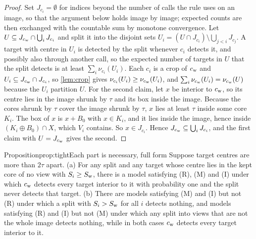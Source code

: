 \begin{proof}
Set $J_{c_i} = \emptyset$ for indices beyond the number of calls the rule uses on an image, so that the argument below holds image by image; expected counts are then exchanged with the countable sum by monotone convergence. Let $U \subseteq J_{c_{\mathrm{w}}} \cap \bigcup_i J_{c_i}$ and split it into the disjoint sets $U_i = (U \cap J_{c_i}) \setminus \bigcup_{j<i} J_{c_j}$. A target with centre in $U_i$ is detected by the split whenever $c_i$ detects it, and possibly also through another call, so the expected number of targets in $U$ that the split detects is at least $\sum_i \nu_{c_i}(U_i)$. Each $c_i$ is a crop of $c_{\mathrm{w}}$ and $U_i \subseteq J_{c_{\mathrm{w}}} \cap J_{c_i}$, so \cref{lem:crop} gives $\nu_{c_i}(U_i) \ge \nu_{c_{\mathrm{w}}}(U_i)$, and $\sum_i \nu_{c_{\mathrm{w}}}(U_i) = \nu_{c_{\mathrm{w}}}(U)$ because the $U_i$ partition $U$. For the second claim, let $x$ be interior to $c_{\mathrm{w}}$, so its centre lies in the image shrunk by $\tau$ and its box inside the image. Because the cores shrunk by $\tau$ cover the image shrunk by $\tau$, $x$ lies at least $\tau$ inside some core $K_i$. The box of $x$ is $x + B_0$ with $x \in K_i$, and it lies inside the image, hence inside $(K_i \oplus B_0) \cap X$, which $V_i$ contains. So $x \in J_{c_i}$. Hence $J_{c_{\mathrm{w}}} \subseteq \bigcup_i J_{c_i}$, and the first claim with $U = J_{c_{\mathrm{w}}}$ gives the second.
\end{proof}

\begin{restate}{Proposition}{prop:tight}{Each part is necessary, full form}
Suppose target centres are more than $2\tau$ apart. (a) For any split and any target whose centre lies in the kept core of no view with $S_i \ge S_{\mathrm{w}}$, there is a model satisfying (R), (M) and (I) under which $c_{\mathrm{w}}$ detects every target interior to it with probability one and the split never detects that target. (b) There are models satisfying (M) and (I) but not (R) under which a split with $S_i > S_{\mathrm{w}}$ for all $i$ detects nothing, and models satisfying (R) and (I) but not (M) under which any split into views that are not the whole image detects nothing, while in both cases $c_{\mathrm{w}}$ detects every target interior to it.
\end{restate}

